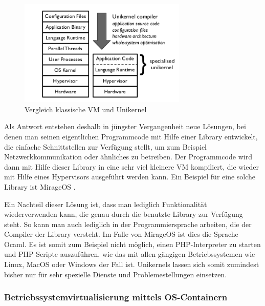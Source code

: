 \begin{figure}[!ht]
  \begin{center}
    \includegraphics[width=8cm]{bilder/comparison-vm-unikernel.png}
    \caption{Vergleich klassische VM und Unikernel \citep[Abb. 1]{MadMorAnd13}}
  \end{center}
\end{figure}

Als Antwort entstehen deshalb in jüngster Vergangenheit neue Lösungen, bei denen man seinen eigentlichen Programmcode mit Hilfe einer Library entwickelt, die einfache Schnittstellen zur Verfügung stellt, um zum Beispiel Netzwerkkommunikation oder ähnliches zu betreiben. Der Programmcode wird dann mit Hilfe dieser Library in eine sehr viel kleinere \ac{VM} kompiliert, die wieder mit Hilfe eines Hypervisors ausgeführt werden kann. Ein Beispiel für eine solche Library ist MirageOS \citep[Vgl.][]{MadMorAnd13}.

Ein Nachteil dieser Lösung ist, dass man lediglich Funktionalität wiederverwenden kann, die genau durch die benutzte Library zur Verfügung steht. So kann man auch lediglich in der Programmiersprache arbeiten, die der Compiler der Library versteht. Im Falle von MirageOS ist dies die Sprache Ocaml. Es ist somit zum Beispiel nicht möglich, einen PHP-Interpreter zu starten und PHP-Scripte auszuführen, wie das mit allen gängigen Betriebssystemen wie Linux, MacOS oder Windows der Fall ist. Unikernels lassen sich somit zumindest bisher nur für sehr spezielle Dienste und Problemestellungen einsetzen.

\subsubsection{Betriebssystemvirtualisierung mittels OS-Containern}

